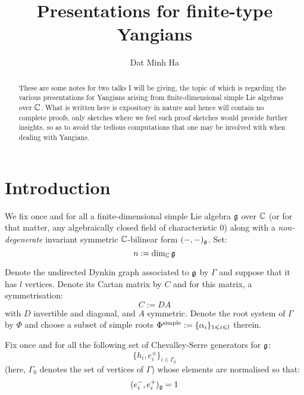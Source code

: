 

\setcounter{section}{-1}





    \title{Presentations for finite-type Yangians}
    
    \author{Dat Minh Ha}
    \maketitle
    
    \begin{abstract}
        These are some notes for two talks I will be giving, the topic of which is regarding the various presentations for Yangians arising from finite-dimensional simple Lie algebras over $\mathbb{C}$. What is written here is expository in nature and hence will contain no complete proofs, only sketches where we feel such proof sketches would provide further insights, so as to avoid the tedious computations that one may be involved with when dealing with Yangians.
    \end{abstract}
    
    {
      \hypersetup{} 
      \tableofcontents %
    }

    \section{Introduction}
        \begin{convention} \label{conv: a_fixed_semi_simple_lie_algebra}
            We fix once and for all a finite-dimensional simple Lie algebra $\mathfrak{g}$ over $\mathbb{C}$ (or for that matter, any algebraically closed field of characteristic $0$) along with a \textit{non-degenerate} invariant symmetric $\mathbb{C}$-bilinear form $(-, -)_{\mathfrak{g}}$. Set:
                $$n := \dim_{\mathbb{C}} \mathfrak{g}$$
                
            Denote the undirected Dynkin graph associated to $\mathfrak{g}$ by $\Gamma$ and suppose that it has $l$ vertices. Denote its Cartan matrix by $C$ and for this matrix, a symmetrisation:
                $$C := DA$$
            with $D$ invertible and diagonal, and $A$ symmetric. Denote the root system of $\Gamma$ by $\Phi$ and choose a subset of simple roots $\Phi^{\mathrm{simple}} := \{\alpha_i\}_{1 \leqslant i \leqslant l}$ therein. 
            
            Fix once and for all the following set of Chevalley-Serre generators for $\mathfrak{g}$:
                $$\{h_i, e_i^{\pm}\}_{i \in \Gamma_0}$$
            (here, $\Gamma_0$ denotes the set of vertices of $\Gamma$) whose elements are normalised so that:
                $$(e_i^-, e_i^+)_{\mathfrak{g}} = 1$$
        \end{convention}

